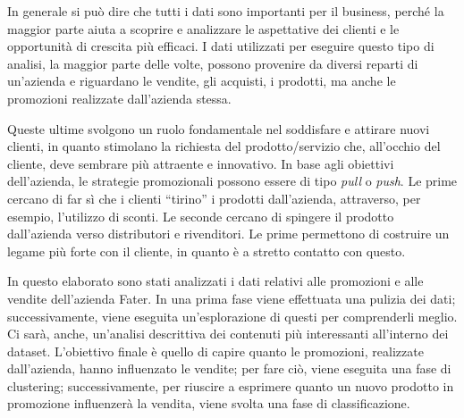 In generale si può dire che tutti i dati sono importanti per il business, perché la maggior parte aiuta a scoprire e analizzare le aspettative dei clienti e le opportunità di crescita più efficaci. I dati utilizzati per eseguire questo tipo di analisi, la maggior parte delle volte,  possono provenire da diversi reparti di un'azienda e riguardano le vendite, gli acquisti, i prodotti, ma  anche le promozioni realizzate dall'azienda stessa.

Queste ultime svolgono un ruolo fondamentale nel soddisfare e attirare nuovi clienti,  in  quanto  stimolano la  richiesta  del  prodotto/servizio che,  all'occhio del cliente, deve  sembrare più  attraente e innovativo. In base agli obiettivi dell'azienda, le strategie promozionali possono essere di tipo \textit{pull} o \textit{push}. Le prime cercano  di  far  sì  che  i  clienti ``tirino”  i  prodotti  dall'azienda, attraverso, per esempio, l'utilizzo di sconti. Le seconde cercano di spingere il prodotto dall'azienda  verso  distributori  e  rivenditori. Le prime permettono di costruire un legame più forte con il cliente, in quanto è a stretto contatto con questo.     



In questo elaborato sono stati analizzati i dati relativi alle promozioni e alle vendite dell'azienda Fater. In una prima fase viene effettuata una pulizia dei dati; successivamente, viene eseguita un'esplorazione di questi per comprenderli meglio. Ci sarà, anche, un'analisi descrittiva dei contenuti più interessanti all'interno dei dataset. L'obiettivo finale è quello di capire quanto le promozioni, realizzate dall'azienda, hanno influenzato le vendite; per fare ciò, viene eseguita una fase di clustering; successivamente, per riuscire a esprimere quanto un nuovo prodotto in  promozione influenzerà la vendita, viene svolta una fase di classificazione.

